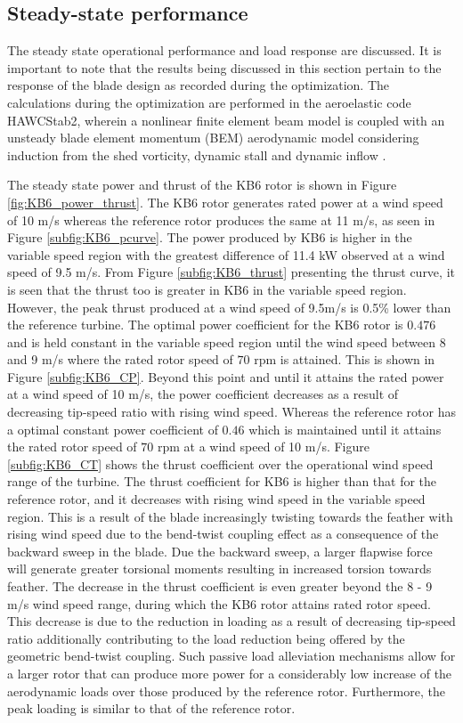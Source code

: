 \subsection{Steady-state performance}
The steady state operational performance and load response are discussed. It is important to note that the results being discussed in this section pertain to the response of the blade design as recorded during the optimization. The calculations during the optimization are performed in the aeroelastic code HAWCStab2, wherein a nonlinear finite element beam model is coupled with an unsteady blade element momentum (BEM) aerodynamic model considering induction from the shed vorticity, dynamic stall and dynamic inflow \cite{hawcstab2}.

The steady state power and thrust of the KB6 rotor is shown in Figure \ref{fig:KB6_power_thrust}. The KB6 rotor generates rated power at a wind speed of 10 m/s whereas the reference rotor produces the same at 11 m/s, as seen in Figure \ref{subfig:KB6_pcurve}. The power produced by KB6 is higher in the variable speed region with the greatest difference of 11.4 kW observed at a wind speed of 9.5 m/s. From Figure \ref{subfig:KB6_thrust} presenting the thrust curve, it is seen that the thrust too is greater in KB6 in the variable speed region. However, the peak thrust produced at a wind speed of 9.5m/s is 0.5\% lower than the reference turbine. The optimal power coefficient for the KB6 rotor is $0.476$ and is held constant in the variable speed region until the wind speed between 8 and 9 m/s where the rated rotor speed of $70$ rpm is attained. This is shown in Figure \ref{subfig:KB6_CP}. Beyond this point and until it attains the rated power at a wind speed of 10 m/s, the power coefficient decreases as a result of decreasing tip-speed ratio with rising wind speed. Whereas the reference rotor has a optimal constant power coefficient of $0.46$ which is maintained until it attains the rated rotor speed of $70$ rpm at a wind speed of 10 m/s. Figure \ref{subfig:KB6_CT} shows the thrust coefficient over the operational wind speed range of the turbine. The thrust coefficient for KB6 is higher than that for the reference rotor, and it decreases with rising wind speed in the variable speed region. This is a result of the blade increasingly twisting towards the feather with rising wind speed due to the bend-twist coupling effect as a consequence of the backward sweep in the blade. Due the backward sweep, a larger flapwise force will generate greater torsional moments resulting in increased torsion towards feather. The decrease in the thrust coefficient is even greater beyond the 8 - 9 m/s wind speed range, during which the KB6 rotor attains rated rotor speed. This decrease is due to the reduction in loading as a result of decreasing tip-speed ratio additionally contributing to the load reduction being offered by the geometric bend-twist coupling. Such passive load alleviation mechanisms allow for a larger rotor that can produce more power for a considerably low increase of the aerodynamic loads over those produced by the reference rotor. Furthermore, the peak loading is similar to that of the reference rotor.  

